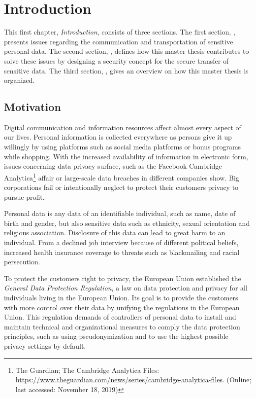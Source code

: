 \chapter{Introduction}
\label{introduction}

This first chapter, \textit{Introduction}, consists of three sections. The first section, \textit{}, presents issues regarding the communication and transportation of sensitive personal data. The second section, \textit{}, defines how this master thesis contributes to solve these issues by designing a security concept for the secure transfer of sensitive data. The third section, \textit{}, gives an overview on how this master thesis is organized. 

\section{Motivation}
\label{motivation}

Digital communication and information resources affect almost every aspect of our lives. Personal information is collected everywhere as persons give it up willingly by using platforms such as social media platforms or bonus programs while shopping. With the increased availability of information in electronic form, issues concerning data privacy surface, such as the Facebook Cambridge Analytica\footnote{The Guardian; The Cambridge Analytica Files: \url{https://www.theguardian.com/news/series/cambridge-analytica-files}. (Online; last accessed:  November 18, 2019)} affair or large-scale data breaches in different companies show. Big corporations fail or intentionally neglect to protect their customers privacy to pursue profit. 

Personal data is any data of an identifiable individual, such as name, date of birth and gender, but also sensitive data such as ethnicity, sexual orientation and religious association. Disclosure of this data can lead to great harm to an individual. From a declined job interview because of different political beliefs, increased health insurance coverage to threats such as blackmailing and racial persecution.

To protect the customers right to privacy, the European Union established the \textit{General Data Protection Regulation}\cite{GDPR}, a law on data protection and privacy for all individuals living in the European Union. Its goal is to provide the customers with more control over their data by unifying the regulations in the European Union. This regulation demands of controllers of personal data to install and maintain technical and organizational measures to comply the data protection principles, such as using pseudonymization and to use the highest possible privacy settings by default.

